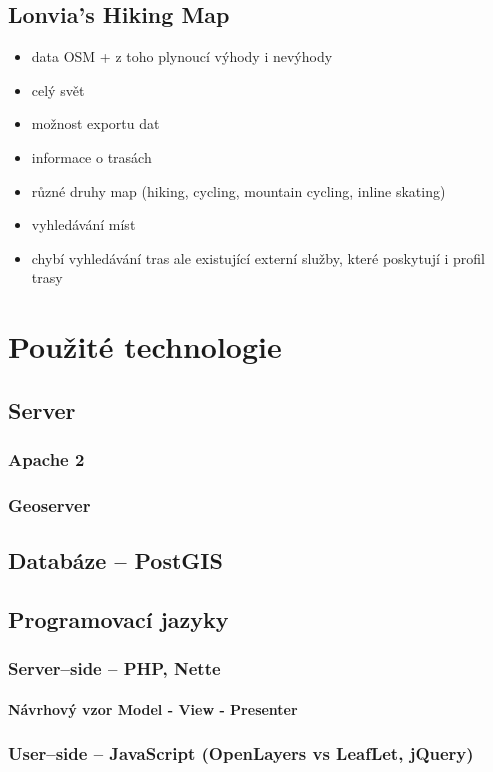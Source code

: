 \documentclass[11pt,a4paper,titlepage,oneside]{book}
\begin{document}
	\section{Lonvia's Hiking Map}
		\begin{itemize}
			\item data OSM + z toho plynoucí výhody i nevýhody
			\item celý svět
			\item možnost exportu dat
			\item informace o trasách
			\item různé druhy map (hiking, cycling, mountain cycling, inline skating)
			\item vyhledávání míst
			\item chybí vyhledávání tras ale existující externí služby, které poskytují i profil trasy
		\end{itemize}
 

\chapter{Použité technologie}
	\section{Server}
		\subsection{Apache 2}
		\subsection{Geoserver}
	\section{Databáze -- PostGIS}
	\section{Programovací jazyky}
		\subsection{Server--side -- PHP, Nette}
			\subsubsection{Návrhový vzor Model - View - Presenter}
		\subsection{User--side -- JavaScript (OpenLayers vs LeafLet, jQuery)}
\end{document}
